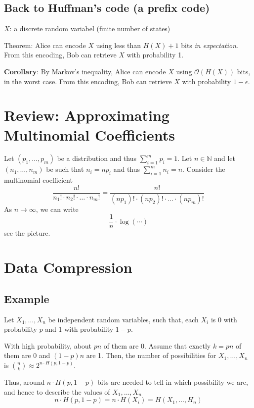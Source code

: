 \documentclass{article}
\begin{document}
\subsection{Back to Huffman's code (a prefix code)}

$X$: a discrete random variabel (finite number of states)

Theorem: Alice can encode $X$ using less than $H(X)+1$ bits \textit{in expectation}. From this encoding, Bob can retrieve $X$ with probability 1.

\textbf{Corollary}: By Markov's inequality, Alice can encode $X$ using $\mathcal{O}\left(H(X)\right)$ bits, in the worst case. From this encoding, Bob can retrieve $X$ with probability $1-\epsilon$.

\section{Review: Approximating Multinomial Coefficients}

Let $\left(p_1,\ldots,p_m\right)$ be a distribution and thus $\sum_{i=1 }^{m }p_i=1$. Let $n\in \mathbb{N }$ and let $\left(n_1,\ldots,n_m\right)$ be such that $n_i=np_i$ and thus $\sum_{i=1 }^{m }n_i=n$. Consider the multinomial coefficient
\[
\frac{n !}{n_1 !\cdot n_2 ! \cdot \ldots \cdot n_m!} = \frac{n!}{(np_1)!\cdot (np_2)!\cdot\ldots \cdot (np_m)!}
\]
As $n\to\infty$, we can write 
\[
\frac{1}{n}\cdot \log\left(\cdots\right)
\]
see the picture.

\section{Data Compression}

\subsection{Example}

Let $X_1,\ldots,X_n$ be independent random variables, such that, each $X_i$ is 0 with probability $p$ and 1 with probability $1-p$.

With high probability, about $pn$ of them are $0$. Assume that exactly $k=pn$ of them are $0$ and $\left(1-p\right)n$ are 1. Then, the number of possibilities for $X_1,\ldots, X_n$ is $\binom{n }{k }\approx 2^{n\cdot H\left(p,1-p\right)}$.

Thus, around $n\cdot H(p,1-p)$ bits are needed to tell in which possibility we are, and hence to describe the values of $X_1,\ldots,X_n$
\[
n\cdot H(p,1-p)= n\cdot H(X_i)=H(X_1,\ldots,H_n)
\]
\end{document}
